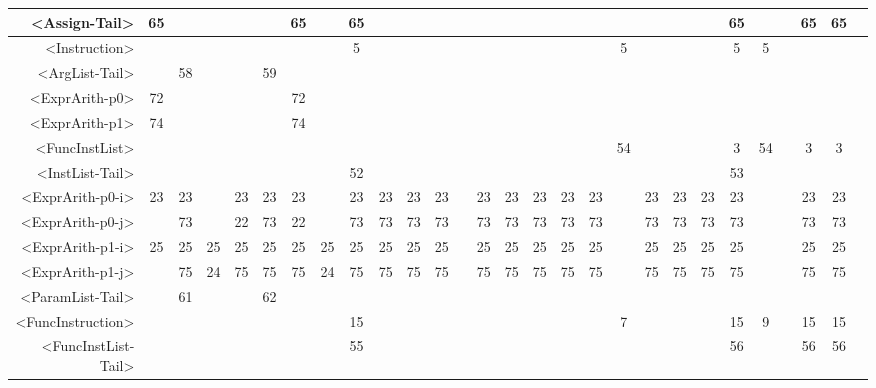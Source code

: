 \begin{tabular}{r|c@{ }c@{ }c@{ }c@{ }c@{ }c@{ }c@{ }c@{ }c@{ }c@{ }c@{ }c@{ }c@{ }c@{ }c@{ }c@{ }c@{ }c@{ }c@{ }c@{ }c@{ }c@{ }c@{ }c@{ }c@{ }c@{ }c@{ }}
<Assign-Tail> & 65 &   &   &   &   & 65 &   & 65 &   &   &   &   &   &   &   &   &   &   &   &   &   & 65 &   &   & 65 & 65 &   \\\hline
<Instruction> &   &   &   &   &   &   &   & 5 &   &   &   &   &   &   &   &   &   & 5 &   &   &   & 5 & 5 &   &   &   &   \\\hline
<ArgList-Tail> &   & 58 &   &   & 59 &   &   &   &   &   &   &   &   &   &   &   &   &   &   &   &   &   &   &   &   &   &   \\\hline
<ExprArith-p0> & 72 &   &   &   &   & 72 &   &   &   &   &   &   &   &   &   &   &   &   &   &   &   &   &   &   &   &   &   \\\hline
<ExprArith-p1> & 74 &   &   &   &   & 74 &   &   &   &   &   &   &   &   &   &   &   &   &   &   &   &   &   &   &   &   &   \\\hline
<FuncInstList> &   &   &   &   &   &   &   &   &   &   &   &   &   &   &   &   &   & 54 &   &   &   & 3 & 54 &   & 3 & 3 &   \\\hline
<InstList-Tail> &   &   &   &   &   &   &   & 52 &   &   &   &   &   &   &   &   &   &   &   &   &   & 53 &   &   &   &   &   \\\hline
<ExprArith-p0-i> & 23 & 23 &   & 23 & 23 & 23 &   & 23 & 23 & 23 & 23 &   & 23 & 23 & 23 & 23 & 23 &   & 23 & 23 & 23 & 23 &   &   & 23 & 23 &   \\\hline
<ExprArith-p0-j> &   & 73 &   & 22 & 73 & 22 &   & 73 & 73 & 73 & 73 &   & 73 & 73 & 73 & 73 & 73 &   & 73 & 73 & 73 & 73 &   &   & 73 & 73 &   \\\hline
<ExprArith-p1-i> & 25 & 25 & 25 & 25 & 25 & 25 & 25 & 25 & 25 & 25 & 25 &   & 25 & 25 & 25 & 25 & 25 &   & 25 & 25 & 25 & 25 &   &   & 25 & 25 &   \\\hline
<ExprArith-p1-j> &   & 75 & 24 & 75 & 75 & 75 & 24 & 75 & 75 & 75 & 75 &   & 75 & 75 & 75 & 75 & 75 &   & 75 & 75 & 75 & 75 &   &   & 75 & 75 &   \\\hline
<ParamList-Tail> &   & 61 &   &   & 62 &   &   &   &   &   &   &   &   &   &   &   &   &   &   &   &   &   &   &   &   &   &   \\\hline
<FuncInstruction> &   &   &   &   &   &   &   & 15 &   &   &   &   &   &   &   &   &   & 7 &   &   &   & 15 & 9 &   & 15 & 15 &   \\\hline
<FuncInstList-Tail> &   &   &   &   &   &   &   & 55 &   &   &   &   &   &   &   &   &   &   &   &   &   & 56 &   &   & 56 & 56 &   \\\hline
\end{tabular}


